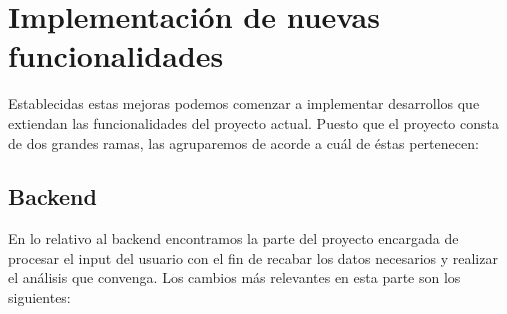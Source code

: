 \documentclass[a4paper, 12pt]{book}
\begin{document}
\section{Implementación de nuevas funcionalidades}

Establecidas estas mejoras podemos comenzar a implementar desarrollos que extiendan las funcionalidades del proyecto actual. Puesto que el proyecto consta de dos grandes ramas, las agruparemos de acorde a cuál de éstas pertenecen:

\subsection{Backend}

En lo relativo al backend encontramos la parte del proyecto encargada de procesar el input del usuario con el fin de recabar los datos necesarios y realizar el análisis que convenga. Los cambios más relevantes en esta parte son los siguientes:
\end{document}
